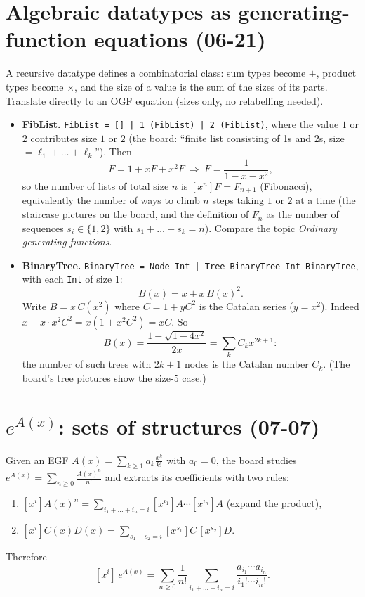 \documentclass[11pt]{article}
\begin{document}
\section{Algebraic datatypes as generating-function equations (06-21)}

A recursive datatype defines a combinatorial class: sum types become $+$, product types become $\times$, and the size of a value is the sum of the sizes of its parts. Translate directly to an OGF equation (sizes only, no relabelling needed).

\begin{itemize}
  \item \textbf{FibList.} \texttt{FibList = [] | 1 (FibList) | 2 (FibList)}, where the value $1$ or $2$ contributes size $1$ or $2$ (the board: ``finite list consisting of 1s and 2s, size $=\ell_1+\dots+\ell_k$''). Then
  \[
  F=1+xF+x^2F\ \Rightarrow\ F=\frac1{1-x-x^2},
  \]
  so the number of lists of total size $n$ is $[x^n]F=F_{n+1}$ (Fibonacci), equivalently the number of ways to climb $n$ steps taking $1$ or $2$ at a time (the staircase pictures on the board, and the definition of $F_n$ as the number of sequences $s_i\in\{1,2\}$ with $s_1+\dots+s_k=n$). Compare the topic \emph{Ordinary generating functions}.
  \item \textbf{BinaryTree.} \texttt{BinaryTree = Node Int | Tree BinaryTree Int BinaryTree}, with each \texttt{Int} of size $1$:
  \[
  B(x)=x+x\,B(x)^2.
  \]
  Write $B=x\,C(x^2)$ where $C=1+yC^2$ is the Catalan series ($y=x^2$). Indeed $x+x\cdot x^2C^2=x(1+x^2C^2)=xC$. So
  \[
  B(x)=\frac{1-\sqrt{1-4x^2}}{2x}=\sum_kC_kx^{2k+1}:
  \]
  the number of such trees with $2k+1$ nodes is the Catalan number $C_k$. (The board's tree pictures show the size-$5$ case.)
\end{itemize}

\section{$e^{A(x)}$: sets of structures (07-07)}

Given an EGF $A(x)=\sum_{k\ge1}a_k\frac{x^k}{k!}$ with $a_0=0$, the board studies $e^{A(x)}=\sum_{n\ge0}\frac{A(x)^n}{n!}$ and extracts its coefficients with two rules:
\begin{enumerate}[nosep]
  \item $[x^i]A(x)^n=\sum_{i_1+\dots+i_n=i}[x^{i_1}]A\cdots[x^{i_n}]A$ (expand the product),
  \item $[x^i]C(x)D(x)=\sum_{s_1+s_2=i}[x^{s_1}]C\,[x^{s_2}]D$.
\end{enumerate}
Therefore
\[
[x^i]\,e^{A(x)}=\sum_{n\ge0}\frac1{n!}\sum_{i_1+\dots+i_n=i}\frac{a_{i_1}\cdots a_{i_n}}{i_1!\cdots i_n!}.
\]
\end{document}
